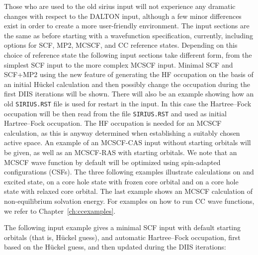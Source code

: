 Those who are used to the old {\sc sirius} input will not
experience any dramatic changes with respect to the DALTON input,
although a few minor differences exist in order to create a more
user-friendly environment. The input sections are the same as
before starting with a wavefunction specification, currently,
including options for SCF, MP2, MCSCF, and CC reference states.
Depending on this choice of reference state the following input
sections take different form, from the simplest SCF input to the
more complex MCSCF input. Minimal SCF and SCF+MP2
using the new feature of generating the HF
occupation on the basis of an initial H\"{u}ckel
calculation and then possibly change the
occupation during the first DIIS iterations will be
shown. There will also be an example showing how an old
\verb|SIRIUS.RST| file is used for restart in the
input. 
In this case the Hartree--Fock occupation will be then read from
the file \verb|SIRIUS.RST| and used as initial Hartree--Fock
occupation.
The HF occupation is
needed for an MCSCF calculation, as this is anyway
determined when establishing a suitably chosen active
space. An example of an
MCSCF-CAS input without starting
orbitals will be given, as well as an
MCSCF-RAS with starting orbitals. We note that an
MCSCF wave function by default will be optimized using
spin-adapted configurations
(CSFs).
The three
following examples illustrate calculations on and excited
state, on a core hole state
with frozen core orbital and on a core hole
state with relaxed core orbital. The last
example shows an MCSCF calculation of non-equilibrium solvation
energy. For examples on how to run CC
wave functions, we refer to Chapter~\ref{ch:ccexamples}.

\bigskip

The following input example gives a minimal
SCF input with default
starting  orbitals (that is, H\"{u}ckel guess), and automatic Hartree--Fock
occupation, first based on the H\"{u}ckel guess, and
then updated during the DIIS iterations:

